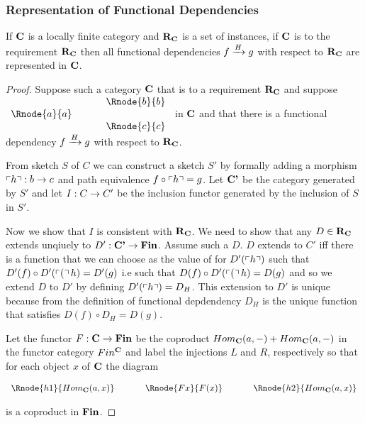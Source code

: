 \subsubsection{Representation of Functional Dependencies}
\begin{lemma}
If $\catc$ is a locally finite category and $\reqtc$ is a set of instances, if $\catc$ is 
 to the requirement $\reqtc$ then
all functional dependencies $\fundep{H}{f}{g}$  with respect to $\reqtc$ are represented in $\catc$.
\end{lemma}
\begin{proof}
Suppose such a category  $\catc$  that  is 
 to a requirement $\reqtc$ and suppose
$
\begin{array}{c p{0.5cm} c  }
             &&   \Rnode{b}{b} \\[0.01cm]
\Rnode{a}{a} &&                \\[0.01cm] 
             &&   \Rnode{c}{c}         
\end{array} 
$
in $\catc$ 
and that there is a functional dependency $\fundep{H}{f}{g}$ with respect to $\reqtc$.

From sketch $S$ of $C$ we can construct a sketch $S'$ by formally adding a morphism $\qq{h}: b \morph c$
and path equivalence $f \circ \qq{h} = g$. Let $\catcp$ be the category generated by $S'$ and
let $I: C \morph C'$ be the inclusion functor generated by the inclusion of $S$ in $S'$. 

\begin{newtt}
Now we show that $I$ is consistent with $\reqtc$. We need to show that any $D \in \reqtc$
extends unqiuely to $D' :\catcp \morph \Fin$. Assume such a $D$. 
$D$  extends to $C'$ iff there is a  function that we can choose as the value of  for $D'(\qq{h})$  such that $D'(f) \circ D'(\qq(h) = D'(g)$ i.e such that
$D(f) \circ D'(\qq(h) = D(g)$ and so we  extend $D$ to $D'$ 
 by defining $D'(\qq{h})=D_H$.
This extension to $D'$ is unique because from the definition of functional depdendency
$D_H$ is the unique function that satisfies $D(f) \circ D_H = D(g)$.
\end{newtt}


Let the functor $F: \catc \morph \Fin$ be the coproduct $Hom_{\catc}(a,-) + Hom_{\catc}(a,-)$
in the functor category $Fin^{\catc}$ and label the injections $L$ and $R$, respectively so that
for each object $x$ of $\catc$ the diagram
\begin{center}
$
\begin{array}{c p{0.5cm} c p{0.5cm} c  }
\Rnode{h1}{Hom_{\catc}(a,x)}  &&\Rnode{Fx}{F(x)}  &&   \Rnode{h2}{Hom_{\catc}(a,x)}       
\end{array} 
$
\end{center}
is a coproduct in $\Fin$.


\end{proof}
